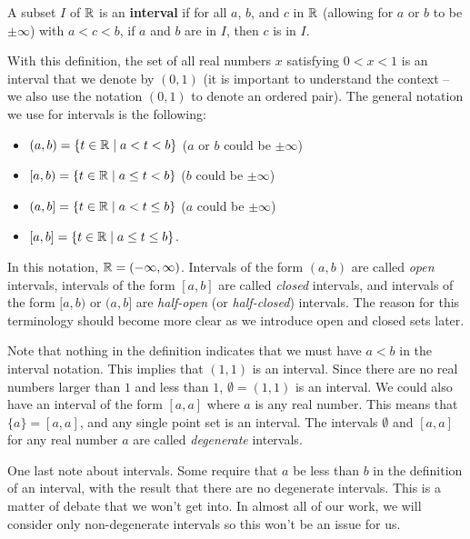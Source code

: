 \begin{definition} A subset $I$ of $\mathbb{R}$ is an \textbf{interval} if for all $a$, $b$, and $c$ in $\mathbb{R}$ (allowing for $a$ or $b$ to be $\pm \infty$) with $a < c < b$, if $a$ and $b$ are in $I$, then $c$ is in $I$. 
\end{definition}

With this definition, the set of all real numbers $x$ satisfying $0 < x < 1$ is an interval that we denote by $(0,1)$ (it is important to understand the context -- we also use the notation $(0,1)$ to denote an ordered pair). The general notation we use for intervals is the following: 
\begin{itemize}
\item $(a,b) = \{t \in \mathbb{R} \mid a < t < b\}$  ($a$ or $b$ could be $\pm \infty$)
\item $[a,b) = \{t \in \mathbb{R} \mid a \leq t < b\}$  ($b$ could be $\pm \infty$)
\item $(a,b] = \{t \in \mathbb{R} \mid a < t \leq b\}$  ($a$ could be $\pm \infty$)
\item $[a,b] = \{t \in \mathbb{R} \mid a \leq t \leq b\}$.
\end{itemize}

In this notation, $\mathbb{R} = (-\infty, \infty)$. Intervals of the form $(a,b)$ are called \emph{open} intervals, intervals of the form $[a,b]$ are called \emph{closed} intervals, and intervals of the form $[a,b)$ or $(a,b]$ are \emph{half-open} (or \emph{half-closed}) intervals. The reason for this terminology should become more clear as we introduce open and closed sets later. 

Note that nothing in the definition indicates that we must have $a < b$ in the interval notation. This implies that $(1,1)$ is an interval. Since there are no real numbers larger than $1$ and less than $1$,  $\emptyset = (1,1)$ is an interval. We could also have an interval of the form $[a,a]$ where $a$ is any real number. This means that $\{a\} = [a,a]$, and any single point set is an interval. The intervals $\emptyset$ and $[a,a]$ for any real number $a$ are called \emph{degenerate} intervals.  

One last note about intervals. Some require that $a$ be less than $b$ in the definition of an interval, with the result that there are no degenerate intervals. This is a matter of debate that we won't get into. In almost all of our work, we will consider only non-degenerate intervals so this won't be an issue for us. 



